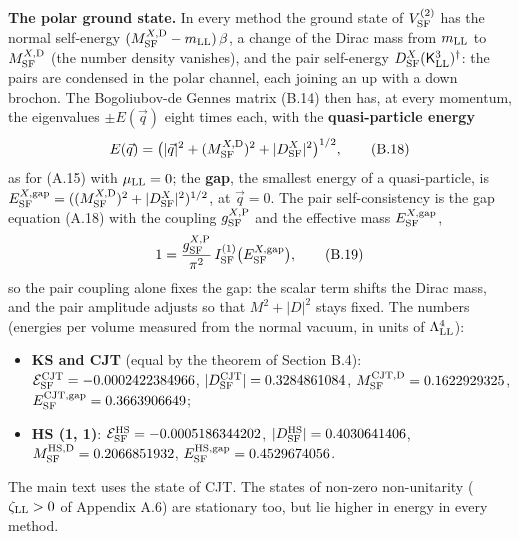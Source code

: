 \documentclass[
  10pt,
]{article}
\providecommand{\tightlist}{%
  \setlength{\itemsep}{0pt}\setlength{\parskip}{0pt}}
\begin{document}
\textbf{The polar ground state.} In every method the ground state of
\(V^{(2)}_{\rm SF}\) has the normal self-energy
\((M^{X,{\rm D}}_{\rm SF}-m_{\rm LL})\,\beta\), a change of the Dirac
mass from \(m_{\rm LL}\) to \(M^{X,{\rm D}}_{\rm SF}\) (the number
density vanishes), and the pair self-energy
\(D^X_{\rm SF}(\mathsf K^3_{\rm LL})^\dagger\): the pairs are condensed
in the polar channel, each joining an up with a down brochon. The
Bogoliubov-de Gennes matrix (B.14) then has, at every momentum, the
eigenvalues \(\pm E(\vec q)\) eight times each, with the
\textbf{quasi-particle energy}
\[E(\vec q)=\big(|\vec q|^2+(M^{X,{\rm D}}_{\rm SF})^2+|D^X_{\rm SF}|^2\big)^{1/2},\tag{B.18}\]
as for (A.15) with \(\mu_{\rm LL}=0\); the \textbf{gap}, the smallest
energy of a quasi-particle, is
\(E^{X,{\rm gap}}_{\rm SF}=((M^{X,{\rm D}}_{\rm SF})^2+|D^X_{\rm SF}|^2)^{1/2}\),
at \(\vec q=0\). The pair self-consistency is the gap equation (A.18)
with the coupling \(g^{X,{\rm P}}_{\rm SF}\) and the effective mass
\(E^{X,{\rm gap}}_{\rm SF}\),
\[1=\frac{g^{X,{\rm P}}_{\rm SF}}{\pi^2}\,I^{(1)}_{\rm SF}\big(E^{X,{\rm gap}}_{\rm SF}\big),\tag{B.19}\]
so the pair coupling alone fixes the gap: the scalar term shifts the
Dirac mass, and the pair amplitude adjusts so that \(M^2+|D|^2\) stays
fixed. The numbers (energies per volume measured from the normal vacuum,
in units of \(\Lambda_{\rm LL}^4\)):

\begin{itemize}
\tightlist
\item
  \textbf{KS and CJT} (equal by the theorem of Section B.4):
  \(\mathcal E^{\rm CJT}_{\rm SF}=-0.0002422384966\),
  \(|D^{\rm CJT}_{\rm SF}|=0.3284861084\),
  \(M^{\rm CJT,D}_{\rm SF}=0.1622929325\),
  \(E^{\rm CJT,gap}_{\rm SF}=0.3663906649\);
\item
  \textbf{HS (1, 1)}: \(\mathcal E^{\rm HS}_{\rm SF}=-0.0005186344202\),
  \(|D^{\rm HS}_{\rm SF}|=0.4030641406\),
  \(M^{\rm HS,D}_{\rm SF}=0.2066851932\),
  \(E^{\rm HS,gap}_{\rm SF}=0.4529674056\).
\end{itemize}

The main text uses the state of CJT. The states of non-zero
non-unitarity (\(\zeta_{\rm LL}>0\) of Appendix A.6) are stationary too,
but lie higher in energy in every method.
\end{document}

